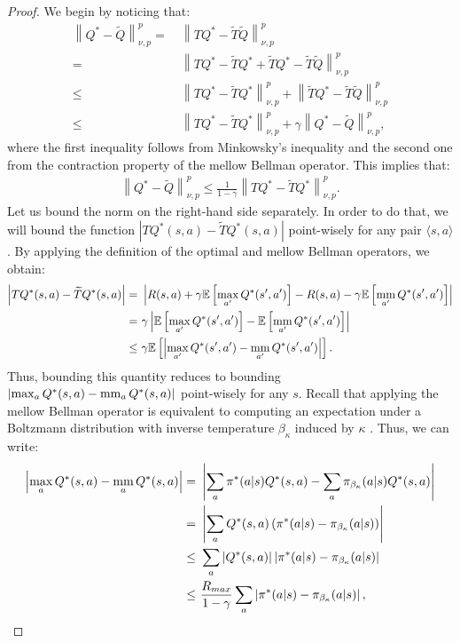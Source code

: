 \documentclass{article}
\newcommand{\mm}{\operatornamewithlimits{mm}}
\newcommand{\wt}[1]{\widetilde{#1}}
\newcommand{\norm}[1]{\left\lVert #1 \right\rVert}
\newcommand{\abs}[1]{\left\lvert #1 \right\rvert}
\begin{document}
\thmm*
\begin{proof}
We begin by noticing that:
\begin{align*}
\norm{Q^*-\wt{Q}}_{\nu,p}^p =\ & \norm{TQ^* - \wt{T}\wt{Q}}_{\nu,p}^p \\ =\ &
\norm{TQ^* - \wt{T}Q^* + \wt{T}Q^* - \wt{T}\wt{Q}}_{\nu,p}^p \\ \leq\ &
\norm{TQ^* - \wt{T}Q^*}_{\nu,p}^p + \norm{\wt{T}Q^* - \wt{T}\wt{Q}}_{\nu,p}^p \\ \leq\ &
\norm{TQ^* - \wt{T}Q^*}_{\nu,p}^p + \gamma\norm{Q^* - \wt{Q}}_{\nu,p}^p,
\end{align*}
where the first inequality follows from Minkowsky's inequality and the second one from the contraction property of the mellow Bellman operator. This implies that:
\begin{align} \label{eq:mm1}
\norm{Q^*-\wt{Q}}_{\nu,p}^p \leq \frac{1}{1-\gamma}\norm{TQ^* - \wt{T}Q^*}_{\nu,p}^p.
\end{align}
Let us bound the norm on the right-hand side separately. In order to do that, we will bound the function $\abs{TQ^*(s,a) - \wt{T}Q^*(s,a)}$ point-wisely for any pair $\langle s,a\rangle$. By applying the definition of the optimal and mellow Bellman operators, we obtain:
\begin{align} \label{eq:mm5}
\abs{TQ^*(s,a) - \wt{T}Q^*(s,a)} =\ & \abs{R(s,a) + \gamma\mathbb{E}\left[\max_{a'}Q^*(s',a')\right] - R(s,a) - \gamma\mathbb{E}\left[\mm_{a'}Q^*(s',a')\right]}\notag \\ =\ & \gamma\abs{\mathbb{E}\left[\max_{a'}Q^*(s',a')\right] - \mathbb{E}\left[\mm_{a'}Q^*(s',a')\right]}\notag \\ \leq\ & \gamma\mathbb{E}\left[\abs{\max_{a'}Q^*(s',a') - \mm_{a'}Q^*(s',a')}\right].
\end{align}
Thus, bounding this quantity reduces to bounding $\abs{\max_{a}Q^*(s,a) - \mm_{a}Q^*(s,a)}$ point-wisely for any $s$. Recall that applying the mellow Bellman operator is equivalent to computing an expectation under a Boltzmann distribution with inverse temperature $\beta_{\kappa}$ induced by $\kappa$ \cite{}. Thus, we can write:
\begin{align} \label{eq:mm2}
\abs{\max_a Q^*(s,a) - \mm_a Q^*(s,a)} =\ & \abs{\sum_a \pi^*(a|s)Q^*(s,a) - \sum_a \pi_{\beta_{\kappa}}(a|s)Q^*(s,a)}\notag\\ =\ & \abs{\sum_a Q^*(s,a) \left( \pi^*(a|s) - \pi_{\beta_{\kappa}}(a|s)  \right)}\notag\\ \leq\ & \sum_a \abs{Q^*(s,a)} \abs{\pi^*(a|s) - \pi_{\beta_{\kappa}}(a|s)}\notag\\ \leq\ & \frac{R_{max}}{1-\gamma}\sum_a\abs{\pi^*(a|s) - \pi_{\beta_{\kappa}}(a|s)},

\end{align}
\end{proof}
\end{document}
